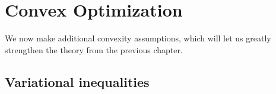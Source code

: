 \setchapterpreamble[u]{\margintoc}
\chapter{Convex Optimization}

We now make additional convexity assumptions, which will let us greatly
strengthen the theory from the previous chapter.

\section{Variational inequalities}